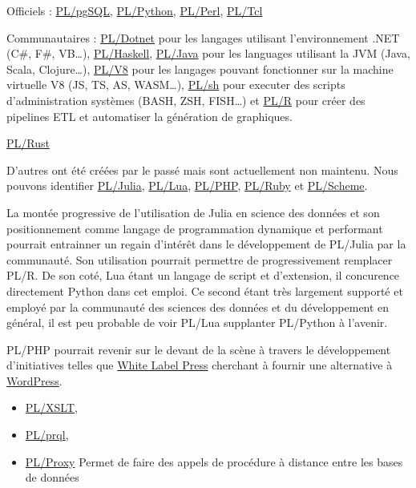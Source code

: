 \documentclass[a4paper,12pt]{article}
\begin{document}
\begin{multicols*}{2}
Officiels : \href{https://www.postgresql.org/docs/current/plpgsql.html}{PL/pgSQL}, \href{https://www.postgresql.org/docs/current/plpython.html}{PL/Python}, \href{https://www.postgresql.org/docs/current/plperl.html}{PL/Perl}, \href{https://www.postgresql.org/docs/current/pltcl.html}{PL/Tcl}

Communautaires : \href{https://github.com/Brick-Abode/pldotnet/}{PL/Dotnet} pour les langages utilisant l'environnement .NET (C\#, F\#, VB\ldots{}), \href{https://github.com/ed-o-saurus/PLHaskell}{PL/Haskell}, \href{https://github.com/tada/pljava/}{PL/Java} pour les languages utilisant la JVM (Java, Scala, Clojure\ldots{}), \href{https://github.com/plv8/plv8}{PL/V8} pour les langages pouvant fonctionner sur la machine virtuelle V8 (JS, TS, AS, WASM\ldots{}), \href{https://github.com/petere/plsh}{PL/sh} pour executer des scripts d'administration systèmes (BASH, ZSH, FISH\ldots{}) et \href{https://github.com/postgres-plr/plr}{PL/R} pour créer des pipelines ETL et automatiser la génération de graphiques.

\href{https://github.com/tcdi/plrust/}{PL/Rust}

D'autres ont été créées par le passé mais sont actuellement non maintenu. Nous pouvons identifier \href{https://github.com/pljulia/pljulia}{PL/Julia}, \href{https://github.com/pllua/pllua-ng/}{PL/Lua}, \href{https://github.com/commandprompt/PL-php}{PL/PHP}, \href{https://github.com/knu/postgresql-plruby}{PL/Ruby} et \href{https://github.com/vy/plscheme}{PL/Scheme}.

La montée progressive de l'utilisation de Julia en science des données et son positionnement comme langage de programmation dynamique et performant pourrait entrainner un regain d'intérêt dans le développement de PL/Julia par la communauté. Son utilisation pourrait permettre de progressivement remplacer PL/R. De son coté, Lua étant un langage de script et d'extension, il concurence directement Python dans cet emploi. Ce second étant très largement supporté et employé par la communauté des sciences des données et du développement en général, il est peu probable de voir PL/Lua supplanter PL/Python à l'avenir. 

PL/PHP pourrait revenir sur le devant de la scène à travers le développement d'initiatives telles que \href{https://github.com/wlp-builders/whitelabelpress-wlp}{White Label Press} cherchant à fournir une alternative à \href{https://github.com/WordPress/WordPress}{WordPress}.

\begin{itemize}
\item \href{https://github.com/petere/plxslt}{PL/XSLT},
\item \href{https://github.com/kaspermarstal/plprql}{PL/prql},
\item \href{https://github.com/plproxy/plproxy}{PL/Proxy} Permet de faire des appels de procédure à distance entre les bases de données
\end{itemize}


\end{multicols*}
\end{document}
